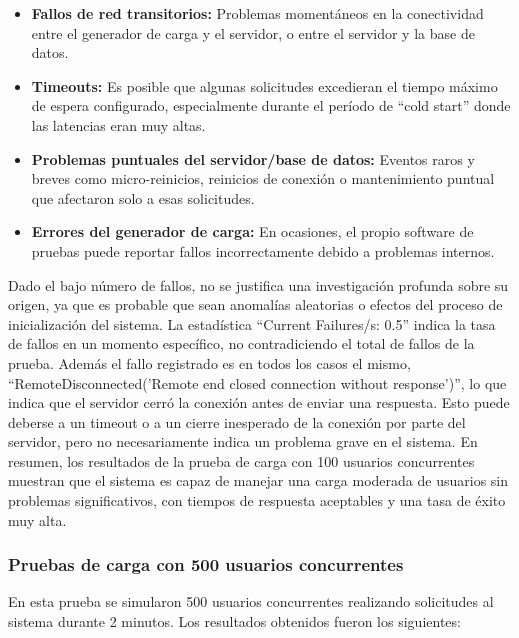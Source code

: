 \begin{itemize}
    \item \textbf{Fallos de red transitorios:} Problemas momentáneos en la conectividad entre el generador de carga y el servidor, o entre el servidor y la base de datos.
    \item \textbf{Timeouts:} Es posible que algunas solicitudes excedieran el tiempo máximo de espera configurado, especialmente durante el período de ``cold start'' donde las latencias eran muy altas.
    \item \textbf{Problemas puntuales del servidor/base de datos:} Eventos raros y breves como micro-reinicios, reinicios de conexión o mantenimiento puntual que afectaron solo a esas solicitudes.
    \item \textbf{Errores del generador de carga:} En ocasiones, el propio software de pruebas puede reportar fallos incorrectamente debido a problemas internos.
\end{itemize}
Dado el bajo número de fallos, no se justifica una investigación profunda sobre su origen, ya que es probable que sean anomalías aleatorias o efectos del proceso de inicialización del sistema. La estadística ``Current Failures/s: 0.5'' indica la tasa de fallos en un momento específico, no contradiciendo el total de fallos de la prueba.
\newline\newline
Además el fallo registrado es en todos los casos el mismo, ``RemoteDisconnected('Remote end closed connection without response')'', lo que indica que el servidor cerró la conexión antes de enviar una respuesta. Esto puede deberse a un timeout o a un cierre inesperado de la conexión por parte del servidor, pero no necesariamente indica un problema grave en el sistema.
\newline\newline
En resumen, los resultados de la prueba de carga con 100 usuarios concurrentes muestran que el sistema es capaz de manejar una carga moderada de usuarios sin problemas significativos, con tiempos de respuesta aceptables y una tasa de éxito muy alta.

\subsubsection{Pruebas de carga con 500 usuarios concurrentes}

En esta prueba se simularon 500 usuarios concurrentes realizando solicitudes al sistema durante 2 minutos. Los resultados obtenidos fueron los siguientes:

